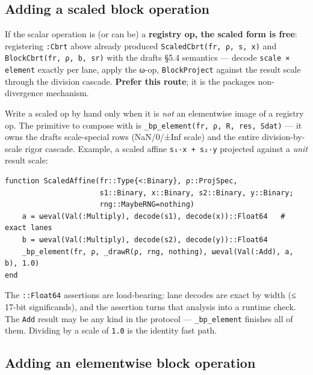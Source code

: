\subsection{Adding a scaled block operation}



\label{10512613773019865025}{}


If the scalar operation is (or can be) a \textbf{registry op, the scaled form is free}: registering \texttt{:Cbrt} above already produced \texttt{ScaledCbrt(fr, ρ, s, x)} and \texttt{BlockCbrt(fr, ρ, b, sr)} with the draft{\textquotesingle}s §5.4 semantics — decode \texttt{scale × element} exactly per lane, apply the ω-op, \texttt{BlockProject} against the result scale through the division cascade. \textbf{Prefer this route}; it is the package{\textquotesingle}s non-divergence mechanism.



Write a scaled op by hand only when it is \emph{not} an elementwise image of a registry op. The primitive to compose with is \texttt{\_bp\_element(fr, ρ, R, res, Sdat)} — it owns the draft{\textquotesingle}s scale-special rows (NaN/0/±Inf scale) and the entire division-by-scale rigor cascade. Example, a scaled affine \texttt{s₁·x + s₂·y} projected against a \emph{unit} result scale:




\begin{verbatim}
function ScaledAffine(fr::Type{<:Binary}, ρ::ProjSpec,
                      s1::Binary, x::Binary, s2::Binary, y::Binary;
                      rng::MaybeRNG=nothing)
    a = ωeval(Val(:Multiply), decode(s1), decode(x))::Float64   # exact lanes
    b = ωeval(Val(:Multiply), decode(s2), decode(y))::Float64
    _bp_element(fr, ρ, _drawR(ρ, rng, nothing), ωeval(Val(:Add), a, b), 1.0)
end
\end{verbatim}



The \texttt{::Float64} assertions are load-bearing: lane decodes are exact by width (≤ 17-bit significands), and the assertion turns that analysis into a runtime check. The \texttt{Add} result may be any kind in the protocol — \texttt{\_bp\_element} finishes all of them. Dividing by a scale of \texttt{1.0} is the identity fast path.



\subsection{Adding an elementwise block operation}



